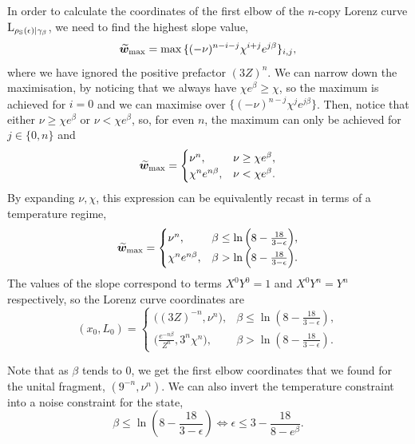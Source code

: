 \documentclass[pra,
aps,
twocolumn,
superscriptaddress,
groupedaddress,
nofootinbib,
reprint
]{revtex4-1}
\begin{document}
In order to calculate the coordinates of the first elbow of the $n$-copy Lorenz curve ${{\rm{L}}_{\rho_{\rm{S}}(\epsilon)|\gamma_\beta}}$, we need to find the highest slope value,
\begin{equation}
	\widetilde{\bm{w}}_{\rm{max}} = \max{\{ (-\nu)^{n-i-j} \chi^{i+j} e^{j\beta} \}_{i,j}},
\end{equation}
where we have ignored the positive prefactor $(3Z)^n$.
We can narrow down the maximisation, by noticing that we always have $\chi e^\beta \geq \chi$, so the maximum is achieved for $i=0$ and we can maximise over $\{ (-\nu)^{n-j} \chi^{j} e^{j\beta} \}$.
Then, notice that either $\nu \geq \chi e^{\beta}$ or $\nu < \chi e^{\beta}$, so, for even $n$, the maximum can only be achieved for $j\in\{0,n\}$ and
\begin{equation}
	\widetilde{\bm{w}}_{\rm{max}} = 
	\begin{cases}
		\nu^n, &\nu \geq \chi e^{\beta}, \\
		\chi^n e^{n\beta}, &\nu < \chi e^{\beta}.
	\end{cases}
\end{equation}
By expanding $\nu, \chi$, this expression can be equivalently recast in terms of a temperature regime,
\begin{equation}\label{eq:temp_regime}
	\widetilde{\bm{w}}_{\rm{max}} = 
	\begin{cases}
		\nu^n, &\beta \leq \ln{\left(8-\frac{18}{3-\epsilon}\right)}, \\
		\chi^n e^{n\beta}, &\beta > \ln{\left(8-\frac{18}{3-\epsilon}\right)}.
	\end{cases}
\end{equation}
The values of the slope correspond to terms $X^0Y^0 = 1$ and $X^0Y^n = Y^n$ respectively, so the Lorenz curve coordinates are
\begin{equation}
	(x_0, L_0) = 
	\begin{cases}
		\Big( (3Z)^{-n}, \nu^n \Big), &\beta \leq \ln{\left(8-\frac{18}{3-\epsilon}\right)}, \\
		\Big( \frac{e^{-n\beta}}{Z^n}, 3^n\chi^n \Big), &\beta > \ln{\left(8-\frac{18}{3-\epsilon}\right)}.
	\end{cases}
\end{equation}

Note that as $\beta$ tends to $0$, we get the first elbow coordinates that we found for the unital fragment, $(9^{-n}, \nu^n)$.
We can also invert the temperature constraint into a noise constraint for the state,
\begin{equation}\label{eq:tempregime}
	\beta \leq \ln{\left(8-\frac{18}{3-\epsilon}\right)} \Leftrightarrow \epsilon \leq 3 - \frac{18}{8-e^{\beta}}.
\end{equation}
\end{document}
